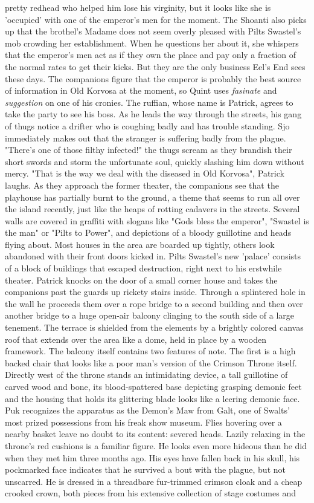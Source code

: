 pretty redhead who helped him lose his virginity, but it looks like she is 'occupied' with one of the emperor's men for the moment. The Shoanti also picks up that the brothel's Madame does not seem overly pleased with Pilts Swastel's mob crowding her establishment. When he questions her about it, she whispers that the emperor's men act as if they own the place and pay only a fraction of the normal rates to get their kicks. But they are the only business Eel's End sees these days. The companions figure that the emperor is probably the best source of information in Old Korvosa at the moment, so Quint uses {\itshape fasinate} and  {\itshape suggestion} on one of his cronies. The ruffian, whose name is Patrick, agrees to take the party to see his boss. As he leads the way through the streets, his gang of thugs notice a drifter who is coughing badly and has trouble standing. Sjo immediately makes out that the stranger is suffering badly from the plague. "There's one of those filthy infected!" the thugs scream as they brandish their short swords and storm the unfortunate soul, quickly slashing him down without mercy. "That is the way we deal with the diseased in Old Korvosa", Patrick laughs. As they approach the former theater, the companions see that the playhouse has partially burnt to the ground, a theme that seems to run all over the island recently, just like the heaps of rotting cadavers in the streets. Several walls are covered in graffiti with slogans like "Gods bless the emperor", "Swastel is the man" or "Pilts to Power", and depictions of a bloody guillotine and heads flying about. Most houses in the area are boarded up tightly, others look abandoned with their front doors kicked in. Pilts Swastel's new 'palace' consists of a block of buildings that escaped destruction, right next to his erstwhile theater. Patrick knocks on the door of a small corner house and takes the companions past the guards up rickety stairs inside. Through a splintered hole in the wall he proceeds them over a rope bridge to a second building and then over another bridge to a huge open-air balcony clinging to the south side of a large tenement. The terrace is shielded from the elements by a brightly colored canvas roof that extends over the area like a dome, held in place by a wooden framework. The balcony itself contains two features of note. The first is a high backed chair that looks like a poor man's version of the Crimson Throne itself. Directly west of the throne stands an intimidating device, a tall guillotine of carved wood and bone, its blood-spattered base depicting grasping demonic feet and the housing that holds its glittering blade looks like a leering demonic face. Puk recognizes the apparatus as the Demon's Maw from Galt, one of Swalts' most prized possessions from his freak show museum. Flies hovering over a nearby basket leave no doubt to its content: severed heads. Lazily relaxing in the throne's red cushions is a familiar figure. He looks even more hideous than he did when they met him three months ago. His eyes have fallen back in his skull, his pockmarked face indicates that he survived a bout with the plague, but not unscarred. He is dressed in a threadbare fur-trimmed crimson cloak and a cheap crooked crown, both pieces from his extensive collection of stage costumes and 